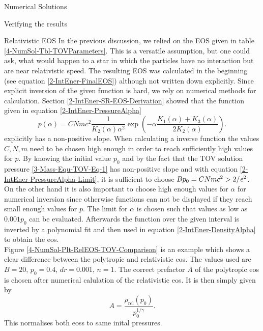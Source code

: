 \begin{section}{Numerical Solutions}
\begin{subsection}{Verifying the results}
% 
\end{subsection}
%
%
\begin{subsection}{Relativistic EOS}
\label{4-NumSol-Sec-RelEOS}
In the previous discussion, we relied on the EOS given in table \ref{4-NumSol-Tbl-TOVParameters}. 
This is a versatile assumption, but one could ask, what would happen to a star in which the particles have no interaction but are near relativistic speed. The resulting EOS was calculated in the beginning (see equation \eqref{2-IntEner-FinalEOS}) although not written down explicitly. 
Since explicit inversion of the given function is hard, we rely on numerical methods for calculation.
Section \ref{2-IntEner-SR-EOS-Derivation} showed that the function given in equation \eqref{2-IntEner-PressureAlpha}
\begin{equation}
	p(\alpha) = CNmc^2\frac{1}{K_2(\alpha)\alpha^2}\exp\left(-\alpha\frac{K_1(\alpha)+K_3(\alpha)}{2K_2(\alpha)}\right).
\end{equation}
explicitly has a non-positive slope. 
When calculating a inverse function the values $C,N,m$ need to be chosen high enough in order to reach sufficiently high values for $p$.
By knowing the initial value $p_0$ and by the fact that the TOV solution pressure \eqref{3-Mass-Equ-TOV-Eq-1} has non-positive slope and with equation \eqref{2-IntEner-PressureAlpha-Limit}, it is sufficient to choose $Bp_0=CNmc^2>2/\mathit{e}^2$. 
On the other hand it is also important to choose high enough values for $\alpha$ for numerical inversion since otherwise functions can not be displayed if they reach small enough values for $p$.
The limit for $\alpha$ is chosen such that values as low as $0.001p_0$ can be evaluated.
Afterwards the function over the given interval is inverted by a polynomial fit and then used in equation \eqref{2-IntEner-DensityAlpha} to obtain the \ac{eos}.\\
Figure \ref{4-NumSol-Plt-RelEOS-TOV-Comparison} is an example which shows a clear difference between the polytropic and relativistic \ac{eos}.
The values used are $B=20$, $p_0=0.4$, $dr=0.001$, $n=1$.
The correct prefactor $A$ of the polytropic \ac{eos} is chosen after numerical calulation of the relativistic \ac{eos}.
It is then simply given by 
\begin{equation}
	A=\frac{\rho_\mathrm{rel}(p_0)}{p_0^{1/\gamma}}.
\end{equation}
This normalises both \acp{eos} to same inital pressures.
\begin{figure}

\end{figure}
\end{subsection}
\end{section}
